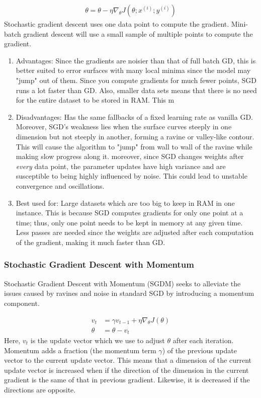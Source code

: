 \documentclass[twoside,11pt]{homework}
\begin{document}
\begin{align*}
	\theta = \theta - \eta \nabla_\theta J(\theta; x^{(i)}; y^{(i)})
\end{align*}
Stochastic gradient descent uses one data point to compute the gradient. Mini-batch gradient descent will use a small sample of multiple points to compute the gradient.
\begin{enumerate}
	\item Advantages: Since the gradients are noisier than that of full batch GD, this is better suited to error surfaces with many local minima since the model may "jump" out of them. Since you compute gradients for much fewer points, SGD runs a lot faster than GD. Also, smaller data sets means that there is no need for the entire dataset to be stored in RAM. This m
	\item Disadvantages: Has the same fallbacks of a fixed learning rate as vanilla GD. Moreover, SGD's weakness lies when the surface curves steeply in one dimension but not steeply in another, forming a ravine or valley-like contour. This will cause the algorithm to "jump" from wall to wall of the ravine while making slow progress along it. moreover, since SGD changes weights after \textit{every} data point, the parameter updates have high variance and are susceptible to being highly influenced by noise. This could lead to unstable convergence and oscillations.
	\item Best used for: Large datasets which are too big to keep in RAM in one instance. This is because SGD computes gradients for only one point at a time; thus, only one point needs to be kept in memory at any given time. Less passes are needed since the weights are adjusted after each computation of the gradient, making it much faster than GD.
\end{enumerate}

\subsubsection*{Stochastic Gradient Descent with Momentum}
Stochastic Gradient Descent with Momentum (SGDM) seeks to alleviate the issues caused by ravines and noise in standard SGD by introducing a momentum component.

\begin{align*}
	v_t &= \gamma v_{t-1} + \eta \nabla_\theta J(\theta)\\
	\theta &= \theta - v_t
\end{align*}
Here, $v_t$ is the update vector which we use to adjust $\theta$ after each iteration. Momentum adds a fraction (the momentum term $\gamma$) of the previous update vector to the current update vector. This means that a dimension of the current update vector is increased when if the direction of the dimension in the current gradient is the same of that in previous gradient. Likewise, it is decreased if the directions are opposite.
\end{document}
